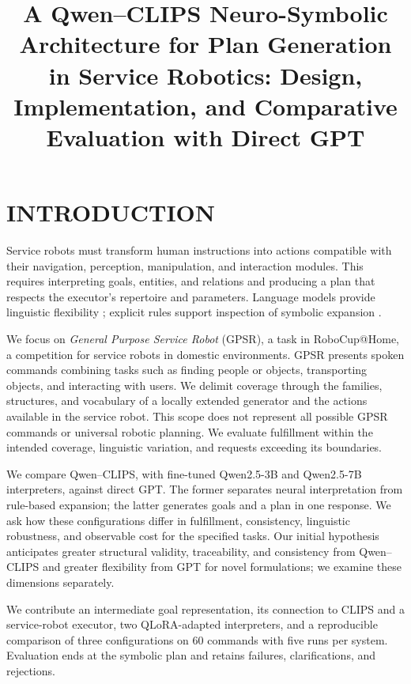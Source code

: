 \documentclass[a4paper,twoside]{article}
\title{A Qwen--CLIPS Neuro-Symbolic Architecture for Plan Generation in Service Robotics: Design, Implementation, and Comparative Evaluation with Direct GPT}
\author{}
\begin{document}
\maketitle

\section{INTRODUCTION}
Service robots must transform human instructions into actions compatible with their navigation, perception, manipulation, and interaction modules. This requires interpreting goals, entities, and relations and producing a plan that respects the executor's repertoire and parameters. Language models provide linguistic flexibility \cite{Vaswani2017,Shi2023}; explicit rules support inspection of symbolic expansion \cite{NASA_CLIPS,Giarratano2005}.

We focus on \emph{General Purpose Service Robot} (GPSR), a task in RoboCup@Home, a competition for service robots in domestic environments. GPSR presents spoken commands combining tasks such as finding people or objects, transporting objects, and interacting with users. We delimit coverage through the families, structures, and vocabulary of a locally extended generator and the actions available in the service robot. This scope does not represent all possible GPSR commands or universal robotic planning. We evaluate fulfillment within the intended coverage, linguistic variation, and requests exceeding its boundaries.

We compare Qwen--CLIPS, with fine-tuned Qwen2.5-3B and Qwen2.5-7B interpreters, against direct GPT. The former separates neural interpretation from rule-based expansion; the latter generates goals and a plan in one response. We ask how these configurations differ in fulfillment, consistency, linguistic robustness, and observable cost for the specified tasks. Our initial hypothesis anticipates greater structural validity, traceability, and consistency from Qwen--CLIPS and greater flexibility from GPT for novel formulations; we examine these dimensions separately.

We contribute an intermediate goal representation, its connection to CLIPS and a service-robot executor, two QLoRA-adapted interpreters, and a reproducible comparison of three configurations on 60 commands with five runs per system. Evaluation ends at the symbolic plan and retains failures, clarifications, and rejections.
\end{document}
